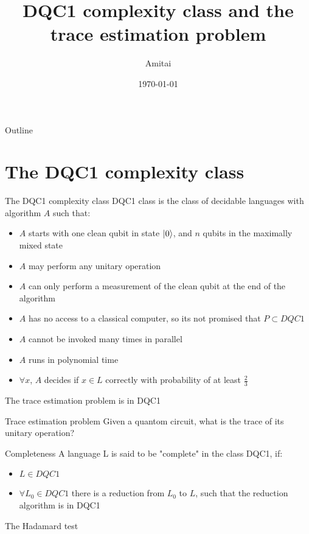 \documentclass[leqno,fleqn]{beamer}
\author{Amitai}
\date{\today}
\title{DQC1 complexity class and the trace estimation problem}
\begin{document}
\maketitle
\begin{frame}{Outline}
\tableofcontents
\end{frame}

\section{The DQC1 complexity class}
\label{sec-1}
\begin{frame}[label=sec-1-1]{The DQC1 complexity class}
DQC1 class is the class of decidable languages with algorithm \(A\) such that:

\begin{itemize}
\item \(A\) starts with one clean qubit in state \(\ket{0}\), and \(n\) qubits in
the maximally mixed state
\item \(A\) may perform any unitary operation
\item \(A\) can only perform a measurement of the clean qubit at the end of
the algorithm
\item \(A\) has no access to a classical computer, so its not promised that
\(P \subset DQC1\)
\item \(A\) cannot be invoked many times in parallel
\item \(A\) runs in polynomial time
\item \(\forall x\), \(A\) decides if \(x \in L\) correctly with probability of
at least \(\frac{2}{3}\)
\end{itemize}
\end{frame}
\begin{frame}[label=sec-1-2]{The trace estimation problem is in DQC1}
\begin{block}{Trace estimation problem}
Given a quantom circuit, what is the trace of its unitary operation?
\end{block}
\begin{block}{Completeness}
A language L is said to be "complete" in the class DQC1, if:
\begin{itemize}
\item \(L \in DQC1\)
\item \(\forall L_{0} \in DQC1\) there is a reduction from \(L_{0}\) to \(L\), such that the reduction algorithm is in DQC1
\end{itemize}
\end{block}
\end{frame}
\begin{frame}[label=sec-1-3]{The Hadamard test}
\end{frame}
\end{document}

